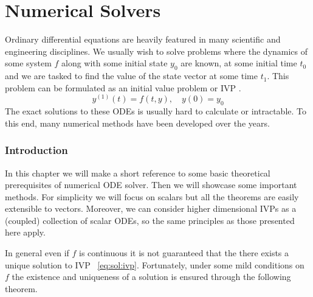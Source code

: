 \documentclass[11pt]{report}
\begin{document}
    \chapter{Numerical Solvers}
    Ordinary differential equations are heavily featured in many scientific and engineering disciplines.
    We usually wish to solve problems where the dynamics of some system $f$ along with some initial state $y_0$ are
    known, at some initial time $t_0$ and we are tasked to find the value of the state vector at some time $t_1$.
    This problem can be formulated as an initial value problem or IVP .
    \begin{equation}
        \label{eq:sol:ivp}
        y^{(1)}(t) = f(t, y), \quad y(0) = y_0
    \end{equation}
    The exact solutions to these ODEs is usually hard to calculate or intractable.
    To this end, many numerical methods have been developed over the years.

    \subsection{Introduction}
    In this chapter we will make a short reference to some basic theoretical prerequisites of numerical ODE solver.
    Then we will showcase some important methods.
    For simplicity we will focus on scalars but all the theorems are easily extensible to vectors.
    Moreover, we can consider higher dimensional IVPs as a (coupled) collection of scalar ODEs, so the same principles as
    those presented here apply.

    In general even if $f$ is continuous it is not guaranteed that the there exists a unique solution to IVP
    ~\eqref{eq:sol:ivp}.
    Fortunately, under some mild conditions on $f$ the existence and uniqueness of a solution is ensured through the
    following theorem.
\end{document}
